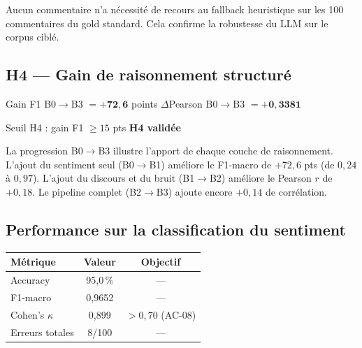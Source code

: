\documentclass[12pt, a4paper]{article}
\begin{document}
Aucun commentaire n'a nécessité de recours au fallback heuristique sur les
100 commentaires du gold standard. Cela confirme la robustesse du LLM sur
le corpus ciblé.

\subsection{H4 — Gain de raisonnement structuré}

\begin{boiteresultat}
  Gain F1 B0$\rightarrow$B3 $= +\mathbf{72{,}6}$ points \quad
  $\Delta$Pearson B0$\rightarrow$B3 $= +\mathbf{0{,}3381}$

  Seuil H4 : gain F1 $\geq 15$ pts \quad
  \textcolor{green!60!black}{\textbf{H4 validée}}
\end{boiteresultat}

La progression B0$\rightarrow$B3 illustre l'apport de chaque couche de
raisonnement. L'ajout du sentiment seul (B0$\rightarrow$B1) améliore le
F1-macro de $+72{,}6$ pts (de $0{,}24$ à $0{,}97$). L'ajout du discours
et du bruit (B1$\rightarrow$B2) améliore le Pearson $r$ de $+0{,}18$.
Le pipeline complet (B2$\rightarrow$B3) ajoute encore $+0{,}14$ de corrélation.

\begin{center}
\end{center}

\subsection{Performance sur la classification du sentiment}

\begin{center}
\begin{tabular}{lcc}
\toprule
Métrique & Valeur & Objectif \\
\midrule
Accuracy          & 95{,}0\,\% & --- \\
F1-macro          & 0{,}9652   & --- \\
Cohen's $\kappa$  & 0{,}899    & $> 0{,}70$ (AC-08) \\
Erreurs totales   & 8/100      & --- \\
\bottomrule
\end{tabular}
\end{center}
\end{document}
